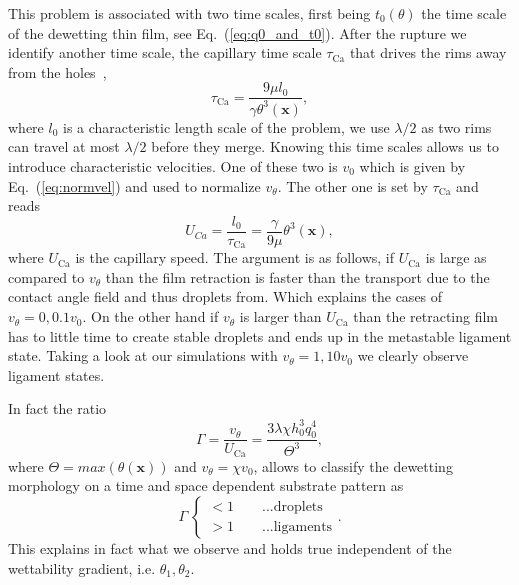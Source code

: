 \documentclass[twocolumn,amsmath,amssymb,showpacs,pre,nofootinbib,superscriptaddress]{revtex4-1} %
\begin{document}
This problem is associated with two time scales, first being $t_0(\theta)$ the time scale of the dewetting thin film, see Eq.~(\ref{eq:q0_and_t0}).
After the rupture we identify another time scale, the capillary time scale $\tau_{\text{Ca}}$ that drives the rims away from the holes~\cite{Edwardse1600183},
\begin{equation}\label{eq:cap_time}
    \tau_{\text{Ca}} = \frac{9\mu l_0}{\gamma \theta^3(\mathbf{x})},
\end{equation}
where  $l_0$ is a characteristic length scale of the problem, we use $\lambda/2$ as two rims can travel at most $\lambda/2$ before they merge.
Knowing this time scales allows us to introduce characteristic velocities.
One of these two is $v_0$ which is given by Eq.~(\ref{eq:normvel}) and used to normalize $v_{\theta}$.
The other one is set by $\tau_{\text{Ca}}$ and reads
\begin{equation}\label{eq:cap_speed}
    U_{Ca} =\frac{l_0}{\tau_{\text{Ca}}} = \frac{\gamma}{9\mu} \theta^3(\mathbf{x}), 
\end{equation}
where $U_{\text{Ca}}$ is the capillary speed.
The argument is as follows, if $U_{\text{Ca}}$ is large as compared to $v_{\theta}$ than the film retraction is faster than the transport due to the contact angle field and thus droplets from.
Which explains the cases of $v_{\theta} = 0, 0.1v_0$.
On the other hand if $v_{\theta}$ is larger than $U_{\text{Ca}}$ than the retracting film has to little time to create stable droplets and ends up in the metastable ligament state.
Taking a look at our simulations with $v_{\theta} = 1, 10v_0$ we clearly observe ligament states.

In fact the ratio 
\begin{equation}\label{eq:vel_ratio}
    \Gamma = \frac{v_{\theta}}{U_{\text{Ca}}} = \frac{3\lambda \chi h_0^3 q_0^4}{\Theta^3}, 
\end{equation}
where $\Theta = max(\theta(\mathbf{x}))$ and $v_{\theta} = \chi v_0$, allows to classify the dewetting morphology on a time and space dependent substrate pattern as
\begin{equation}\label{eq:classify}
    \Gamma~\begin{cases}
    < 1\qquad ... \text{droplets} \\
    > 1\qquad ... \text{ligaments} 
    \end{cases}.
\end{equation}
This explains in fact what we observe and holds true independent of the wettability gradient, i.e. $\theta_1, \theta_2$.
\end{document}
